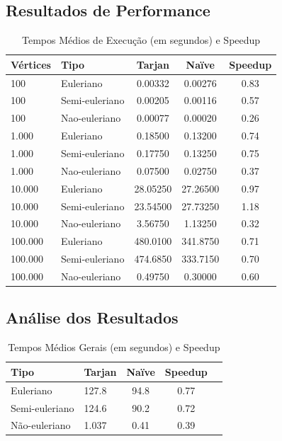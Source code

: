 \documentclass[12pt]{article}
\begin{document}
\subsection{Resultados de Performance}

\begin{table}[ht]
\centering
\caption{Tempos Médios de Execução (em segundos) e Speedup }
\label{tab:resultados}
\begin{tabular}{|l|l|c|c|c|}
\hline
\textbf{Vértices} & \textbf{Tipo} & \textbf{Tarjan} & \textbf{Naïve} & \textbf{Speedup} \\
\hline
100 & Euleriano & 0.00332 & 0.00276 & 0.83 \\
100 & Semi-euleriano &  0.00205 & 0.00116 & 0.57 \\
100 & Nao-euleriano & 0.00077 & 0.00020 & 0.26 \\
\hline
1.000 & Euleriano & 0.18500 & 0.13200 & 0.74 \\
1.000 & Semi-euleriano &  0.17750 & 0.13250 &  0.75 \\
1.000 & Nao-euleriano & 0.07500 & 0.02750 & 0.37 \\
\hline
10.000 & Euleriano & 28.05250 & 27.26500 & 0.97 \\
10.000 & Semi-euleriano & 23.54500 & 27.73250 & 1.18 \\
10.000 & Nao-euleriano & 3.56750 & 1.13250 & 0.32 \\
\hline
100.000 & Euleriano & 480.0100 & 341.8750 & 0.71 \\
100.000 & Semi-euleriano & 474.6850 & 333.7150 & 0.70 \\
100.000 & Nao-euleriano & 0.49750 & 0.30000 & 0.60 \\
\hline
\end{tabular}
\end{table}

\subsection{Análise dos Resultados}

\begin{table}[ht]
\centering
\caption{Tempos Médios Gerais (em segundos) e Speedup}
\label{tab:resultados}
\begin{tabular}{|l|l|c|c|c|}
\hline
\textbf{Tipo} & \textbf{Tarjan} & \textbf{Naïve} & \textbf{Speedup} \\
\hline
Euleriano & 127.8 & 94.8 & 0.77 \\
\hline
Semi-euleriano & 124.6 & 90.2 & 0.72 \\
\hline
Não-euleriano & 1.037 & 0.41 & 0.39 \\
\hline
\end{tabular}
\end{table}
\end{document}
